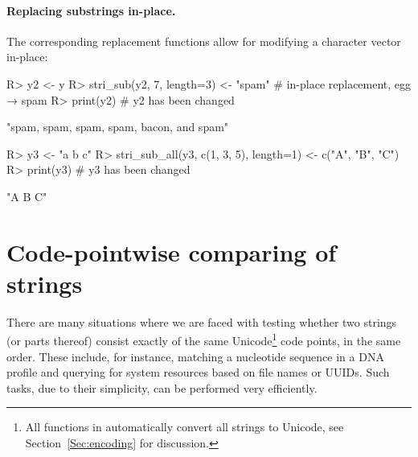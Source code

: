 \documentclass[nojss]{jss}
\begin{document}
\paragraph{Replacing substrings in-place.}
The corresponding {replacement functions} allow for modifying
a character vector in-place:

\begin{Schunk}
\begin{Sinput}
R> y2 <- y
R> stri_sub(y2, 7, length=3) <- "spam"  # in-place replacement, egg → spam
R> print(y2)                            # y2 has been changed
\end{Sinput}
\begin{Soutput}
[1] "spam, spam, spam, spam, bacon, and spam"
\end{Soutput}
\end{Schunk}

\begin{Schunk}
\begin{Sinput}
R> y3 <- "a b c"
R> stri_sub_all(y3, c(1, 3, 5), length=1) <- c("A", "B", "C")
R> print(y3)                            # y3 has been changed
\end{Sinput}
\begin{Soutput}
[1] "A B C"
\end{Soutput}
\end{Schunk}






\section{Code-pointwise comparing of strings}\label{Sec:fixed}

There are many situations where we are faced with testing whether two strings
(or parts thereof)
consist exactly of the same Unicode\footnote{All functions in 
automatically convert all  strings
to Unicode, see Section~\ref{Sec:encoding} for discussion.} code points, in the same order.
These include, for instance, matching a nucleotide sequence
in a DNA profile and querying for system resources based on file names or UUIDs.
Such tasks, due to their simplicity, can be performed very efficiently.
\end{document}
